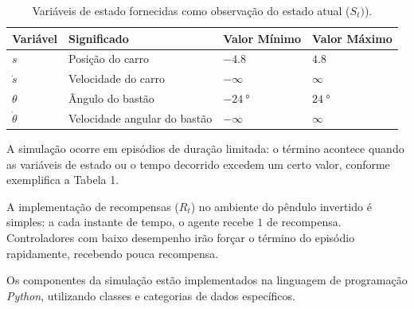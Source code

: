 \begin{table}[!htb]
\centering
\caption{Variáveis de estado fornecidas como observação do estado atual ($S_t)$).}
\label{tab:2gym-observacao}
\begin{tabular}{l|l|l|l} \toprule
{Variável} & {Significado} & {Valor Mínimo} & {Valor Máximo}\\ \midrule
{$s$} & {Posição do carro} & {$-4.8$} & {$4.8$} \\
{$\dot{s}$} & {Velocidade do carro} & {$-\infty$} & {$\infty$} \\
{$\theta$} & {Ângulo do bastão} &{$\SI{-24}{\degree}$} & {$\SI{24}{\degree}$} \\
{$\dot\theta$} & {Velocidade angular do bastão} & {$-\infty$} & {$\infty$}
\\ \bottomrule
\end{tabular}
\end{table}

A simulação ocorre em episódios de duração limitada: o término acontece quando as variáveis de estado ou o tempo decorrido excedem um certo valor, conforme exemplifica a Tabela 1.

A implementação de recompensas ($R_t$) no ambiente do pêndulo invertido é simples: a cada instante de tempo, o agente recebe $1$ de recompensa. Controladores com baixo desempenho irão forçar o término do episódio rapidamente, recebendo pouca recompensa. 

Os componentes da simulação estão implementados na linguagem de programação \textit{Python}, utilizando classes e categorias de dados específicos.

